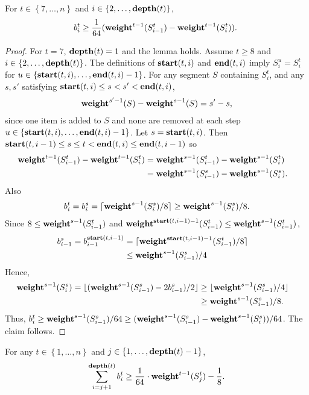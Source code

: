 \documentclass[unicode,review]{siamart1116}
\newcommand{\natInt}[2]{ \left\{ #1, \dotsc, #2 \right\} }
\newcommand{\weight}{{\rm {\bf weight}}}
\newcommand{\depth}{{\rm {\bf depth}}}
\newcommand{\starts}{{\rm {\bf start}}}
\newcommand{\sends}{{\rm {\bf end}}}
\numberwithin{theorem}{section}
\begin{document}
\begin{lemma}\label{l-p1}
For $t \in \natInt{7}{n}$ and $i \in \natInt{2}{\depth(t)}$,
\begin{align*}
b^t_{i} \ge \frac{1}{64}(\weight^{t-1}(S^t_{i-1}) - \weight^{t-1}(S^t_{i})).\
\end{align*}
\end{lemma}


\begin{proof} %
For $t=7$, $\depth(t)=1$ and the lemma holds. 
Assume $t\ge 8$ and $i \in \natInt{2}{\depth(t)}$.
The definitions of $\starts(t,i)$ and $\sends(t,i)$ imply $S^u_{i}=S^t_{i}$ for
$u \in \natInt{\starts(t,i)}{\sends(t,i)-1}$. For any
segment $S$ containing $S^t_{i}$, and any  $s,s'$ satisfying $\starts(t,i)\le s < s' < \sends(t,i)$,
\begin{align*}
\weight^{s'-1}(S) - \weight^{s-1}(S) = s'-s,
\end{align*}
since one item is added to $S$ and none are removed at each step 
$u \in \natInt{\starts(t,i)}{\sends(t,i)-1}$.
Let $s=\starts(t,i)$. Then $\starts(t,i-1) \le s \le t <  \sends(t,i) \le \sends(t,i-1)$ so
\begin{align*}
\weight^{t-1}(S^t_{i-1}) - \weight^{t-1}(S^t_{i}) &= \weight^{s-1}(S^t_{i-1}) - \weight^{s-1}(S^t_{i}) \cr
&= \weight^{s-1}(S^s_{i-1}) - \weight^{s-1}(S^s_{i}).
\end{align*}
Also
\begin{align*}
b^t_{i} = b^s_{i} = \lceil \weight^{s-1}(S^s_{i})/8\rceil \ge  \weight^{s-1}(S^s_{i})/8.
\end{align*}
Since $8 \le \weight^{s-1}(S^t_{i-1})$ and $\weight^{\starts(t,i-1)-1}(S^t_{i-1}) \le \weight^{s-1}(S^t_{i-1})$,
\begin{align*}
b^s_{i-1} = b^{\starts(t,i-1)}_{i-1} &= \lceil \weight^{\starts(t,i-1)-1}(S^t_{i-1})/8 \rceil \cr
&\le \weight^{s-1}(S^s_{i-1})/4
\end{align*}
Hence,
\begin{align*}
\weight^{s-1}(S^s_{i}) = \lfloor  (\weight^{s-1}(S^s_{i-1}) - 2b^s_{i-1} )/ 2 \rfloor &\ge \lfloor \weight^{s-1}(S^s_{i-1})/4 \rfloor \cr &\ge \weight^{s-1}(S^s_{i-1})/8.
\end{align*}
Thus, $b^t_{i} \ge \weight^{s-1}(S^s_{i-1})/64 \ge (\weight^{s-1}(S^s_{i-1}) - \weight^{s-1}(S^s_{i}))/64$. The claim follows.
\end{proof}



\begin{corollary}\label{c-weight}
For any $t \in \natInt{1}{n}$ and $j \in \natInt{1}{\depth(t)-1}$,$$\sum_{i=j+1}^{\depth(t)} b^t_{i} \ge 
\frac{1}{64} \cdot \weight^{t-1}(S^t_j) - \frac{1}{8}.$$
\end{corollary}
\end{document}
